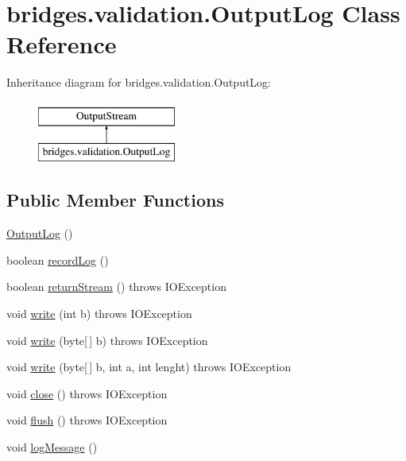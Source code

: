 \hypertarget{classbridges_1_1validation_1_1_output_log}{}\section{bridges.\+validation.\+Output\+Log Class Reference}
\label{classbridges_1_1validation_1_1_output_log}
Inheritance diagram for bridges.\+validation.\+Output\+Log\+:\begin{figure}[H]
\begin{center}
\leavevmode
\includegraphics[height=2.000000cm]{classbridges_1_1validation_1_1_output_log}
\end{center}
\end{figure}
\subsection*{Public Member Functions}
\begin{DoxyCompactItemize}
\item 
\hyperlink{classbridges_1_1validation_1_1_output_log_a47a7efee1dce6f11f3de83d48994a56f}{Output\+Log} ()
\item 
boolean \hyperlink{classbridges_1_1validation_1_1_output_log_aae5e41b4b23adb56e3c97d2c17ad0768}{record\+Log} ()
\item 
boolean \hyperlink{classbridges_1_1validation_1_1_output_log_a4ec6037db31ff9dc0664d341183f296f}{return\+Stream} ()  throws I\+O\+Exception 
\item 
void \hyperlink{classbridges_1_1validation_1_1_output_log_a68ed2055f1a0626674675354feeb9d54}{write} (int b)  throws I\+O\+Exception 
\item 
void \hyperlink{classbridges_1_1validation_1_1_output_log_a6489f70aa4e2903456ed05315dd59f31}{write} (byte\mbox{[}$\,$\mbox{]} b)  throws I\+O\+Exception 
\item 
void \hyperlink{classbridges_1_1validation_1_1_output_log_ad0ada8f6ff72218f18b64672690fc94f}{write} (byte\mbox{[}$\,$\mbox{]} b, int a, int lenght)  throws I\+O\+Exception 
\item 
void \hyperlink{classbridges_1_1validation_1_1_output_log_a6ab7881cd35aa11cc830dab4732fe66d}{close} ()  throws I\+O\+Exception 
\item 
void \hyperlink{classbridges_1_1validation_1_1_output_log_ab810fd1e3d7e939bcdf1ec38978c02cd}{flush} ()  throws I\+O\+Exception 
\item 
void \hyperlink{classbridges_1_1validation_1_1_output_log_aea898d0de8715c1451d4731f3d9ae91d}{log\+Message} ()
\end{DoxyCompactItemize}
